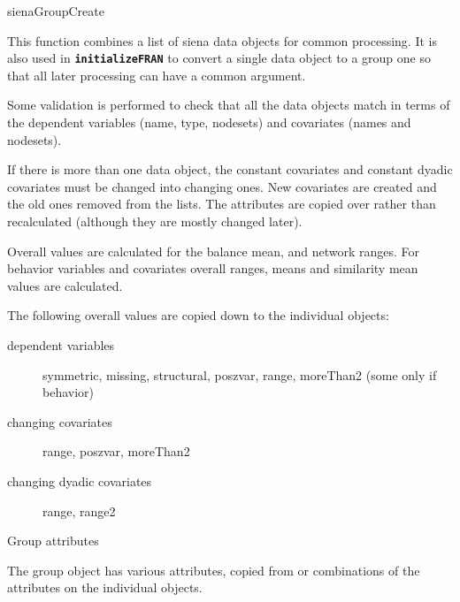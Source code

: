 \documentclass[12pt,a4paper]{article}
\makeatletter
\renewcommand{\=}{\,=\,}
\newcommand{\+}{\,+\,}
\renewcommand{\section}{\@startsection{section}{1}
                {0pt}{\baselineskip}{0.5\baselineskip}
                {\centering\sffamily} }
\renewcommand{\subsection}{\@startsection{subsection}{2}
                {0pt}{0.7\baselineskip}{0.3\baselineskip}
                {\sffamily} }
\newcommand{\sfn}[1]{\textbf{\texttt{#1}}}
\makeatother
\begin{document}
\section{sienaGroupCreate}

This function combines a list of siena data objects for common processing.
It is also used in \sfn{initializeFRAN} to convert a single data object to a group one so that all later
processing can have a common argument.

Some validation is performed to check that all the data objects match in terms
of the dependent variables (name, type, nodesets) and covariates (names and
nodesets).

If there is more than one data object, the constant covariates and constant
dyadic covariates must be changed into changing ones. New covariates are created
and the old ones removed from the lists. The attributes are copied over rather
than recalculated (although they are mostly changed later).

Overall values are calculated for the balance mean, and network ranges. For
behavior variables and covariates overall ranges, means and similarity mean
values are calculated.

The following overall values are copied down to the individual objects:
\begin{description}

\item[dependent variables] symmetric, missing, structural, poszvar, range,
moreThan2 (some only if behavior)
\item[changing covariates] range,  poszvar, moreThan2
\item[changing dyadic covariates] range, range2

\end{description}
\subsection{Group attributes}

The group object has various attributes, copied from or combinations of the
attributes on the individual objects.
\end{document}
